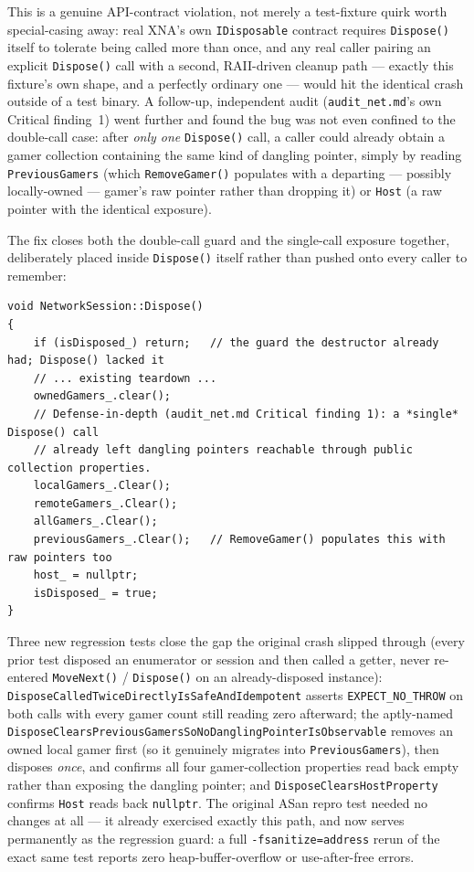 This is a genuine API-contract violation, not merely a test-fixture quirk worth special-casing
away: real XNA's own \texttt{IDisposable} contract requires \texttt{Dispose()} itself to
tolerate being called more than once, and any real caller pairing an explicit
\texttt{Dispose()} call with a second, RAII-driven cleanup path --- exactly this fixture's own
shape, and a perfectly ordinary one --- would hit the identical crash outside of a test binary.
A follow-up, independent audit (\texttt{audit\_net.md}'s own Critical finding~1) went further
and found the bug was not even confined to the double-call case: after \emph{only one}
\texttt{Dispose()} call, a caller could already obtain a gamer collection containing the same
kind of dangling pointer, simply by reading \texttt{PreviousGamers} (which
\texttt{RemoveGamer()} populates with a departing --- possibly locally-owned --- gamer's raw
pointer rather than dropping it) or \texttt{Host} (a raw  pointer with the
identical exposure).

The fix closes both the double-call guard and the single-call exposure together, deliberately
placed inside \texttt{Dispose()} itself rather than pushed onto every caller to remember:

\begin{lstlisting}
void NetworkSession::Dispose()
{
    if (isDisposed_) return;   // the guard the destructor already had; Dispose() lacked it
    // ... existing teardown ...
    ownedGamers_.clear();
    // Defense-in-depth (audit_net.md Critical finding 1): a *single* Dispose() call
    // already left dangling pointers reachable through public collection properties.
    localGamers_.Clear();
    remoteGamers_.Clear();
    allGamers_.Clear();
    previousGamers_.Clear();   // RemoveGamer() populates this with raw pointers too
    host_ = nullptr;
    isDisposed_ = true;
}
\end{lstlisting}

Three new regression tests close the gap the original crash slipped through (every prior test
disposed an enumerator or session and then called a getter, never re-entered
\texttt{MoveNext()} / \texttt{Dispose()} on an already-disposed instance):
\texttt{DisposeCalledTwiceDirectlyIsSafeAndIdempotent} asserts \texttt{EXPECT\_NO\_THROW} on both
calls with every gamer count still reading zero afterward; the aptly-named
\texttt{DisposeClearsPreviousGamersSoNoDanglingPointerIsObservable} removes an owned local gamer
first (so it genuinely migrates into \texttt{PreviousGamers}), then disposes \emph{once}, and
confirms all four gamer-collection properties read back empty rather than exposing the dangling
pointer; and \texttt{DisposeClearsHostProperty} confirms \texttt{Host} reads back
\texttt{nullptr}. The original ASan repro test needed no changes at all --- it already exercised
exactly this path, and now serves permanently as the regression guard: a full
\texttt{-fsanitize=address} rerun of the exact same test reports zero heap-buffer-overflow or
use-after-free errors.

